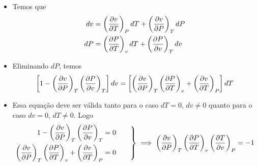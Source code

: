 \documentclass[t,%
brazilian,%
11pt,%
aspectratio=169,%
table%
]{beamer}
\begin{document}
\begin{frame}
    \begin{itemize}
        \item Temos que
            \begin{align*}
                dv&=\left(\frac{\partial v}{\partial T}\right)_P dT + \left(\frac{\partial v}{\partial P}\right)_T dP \\
                dP&=\left(\frac{\partial P}{\partial T}\right)_v dT + \left(\frac{\partial P}{\partial v}\right)_T dv
            \end{align*}
        \item Eliminando \(dP\), temos
            \[
                \left[1-\left(\frac{\partial v}{\partial P}\right)_T \left(\frac{\partial P}{\partial v}\right)_T\right] dv =
                \left[\left(\frac{\partial v}{\partial P}\right)_T \left(\frac{\partial P}{\partial T}\right)_v+\left(\frac{\partial v}{\partial T}\right)_P\right] dT
            \]
        \item Essa equação deve ser válida tanto para o caso \(dT=0\), 
            \(dv\neq 0\) quanto para o caso \(dv=0\), \(dT\neq 0\). Logo
            \[
                \left.
                \begin{aligned}
                    1-\left(\frac{\partial v}{\partial P}\right)_T \left(\frac{\partial P}{\partial v}\right)_T &= 0 \\
                    \left(\frac{\partial v}{\partial P}\right)_T \left(\frac{\partial P}{\partial T}\right)_v+\left(\frac{\partial v}{\partial T}\right)_P &=0
                \end{aligned}
                \qquad
                \right\}
                \implies
                \left(\frac{\partial v}{\partial P}\right)_T\left(\frac{\partial P}{\partial T}\right)_v\left(\frac{\partial T}{\partial v}\right)_P=-1
            \]

    \end{itemize}
\end{frame}

\end{document}
